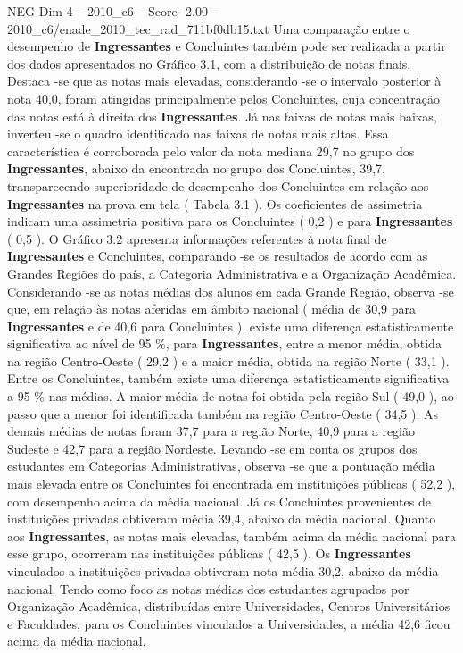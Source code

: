 \begin{textsample}{NEG Dim 4 – 2010\_c6 – Score -2.00 – 2010\_c6/enade\_2010\_tec\_rad\_711bf0db15.txt}
Uma comparação entre o desempenho de \textbf{Ingressantes} e Concluintes também pode ser realizada a partir dos dados apresentados no Gráfico 3.1, com a distribuição de notas finais.
Destaca -se que as notas mais elevadas, considerando -se o intervalo posterior à nota 40,0, foram atingidas principalmente pelos Concluintes, cuja concentração das notas está à direita dos \textbf{Ingressantes}.
Já nas faixas de notas mais baixas, inverteu -se o quadro identificado nas faixas de notas mais altas.
Essa característica é corroborada pelo valor da nota mediana 29,7 no grupo dos \textbf{Ingressantes}, abaixo da encontrada no grupo dos Concluintes, 39,7, transparecendo superioridade de desempenho dos Concluintes em relação aos \textbf{Ingressantes} na prova em tela ( Tabela 3.1 ).
Os coeficientes de assimetria indicam uma assimetria positiva para os Concluintes ( 0,2 ) e para \textbf{Ingressantes} ( 0,5 ).
O Gráfico 3.2 apresenta informações referentes à nota final de \textbf{Ingressantes} e Concluintes, comparando -se os resultados de acordo com as Grandes Regiões do país, a Categoria Administrativa e a Organização Acadêmica.
Considerando -se as notas médias dos alunos em cada Grande Região, observa -se que, em relação às notas aferidas em âmbito nacional ( média de 30,9 para \textbf{Ingressantes} e de 40,6 para Concluintes ), existe uma diferença estatisticamente significativa ao nível de 95 \%, para \textbf{Ingressantes}, entre a menor média, obtida na região Centro-Oeste ( 29,2 ) e a maior média, obtida na região Norte ( 33,1 ).
Entre os Concluintes, também existe uma diferença estatisticamente significativa a 95 \% nas médias.
A maior média de notas foi obtida pela região Sul ( 49,0 ), ao passo que a menor foi identificada também na região Centro-Oeste ( 34,5 ).
As demais médias de notas foram 37,7 para a região Norte, 40,9 para a região Sudeste e 42,7 para a região Nordeste.
Levando -se em conta os grupos dos estudantes em Categorias Administrativas, observa -se que a pontuação média mais elevada entre os Concluintes foi encontrada em instituições públicas ( 52,2 ), com desempenho acima da média nacional.
Já os Concluintes provenientes de instituições privadas obtiveram média 39,4, abaixo da média nacional.
Quanto aos \textbf{Ingressantes}, as notas mais elevadas, também acima da média nacional para esse grupo, ocorreram nas instituições públicas ( 42,5 ).
Os \textbf{Ingressantes} vinculados a instituições privadas obtiveram nota média 30,2, abaixo da média nacional.
Tendo como foco as notas médias dos estudantes agrupados por Organização Acadêmica, distribuídas entre Universidades, Centros Universitários e Faculdades, para os Concluintes vinculados a Universidades, a média 42,6 ficou acima da média nacional.

\end{textsample}
